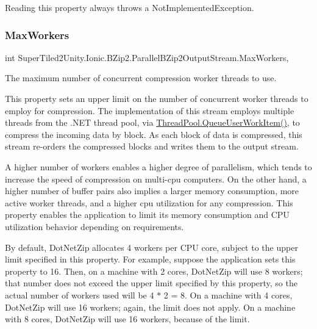 Reading this property always throws a Not\+Implemented\+Exception. 

\mbox{\label{class_super_tiled2_unity_1_1_ionic_1_1_b_zip2_1_1_parallel_b_zip2_output_stream_a489040cd5f0d61998d1d64ed539cdfd2}} 
\subsubsection{\texorpdfstring{Max\+Workers}{MaxWorkers}}
{\footnotesize\ttfamily int Super\+Tiled2\+Unity.\+Ionic.\+B\+Zip2.\+Parallel\+B\+Zip2\+Output\+Stream.\+Max\+Workers\hspace{0.3cm}{\ttfamily [get]}, {\ttfamily [set]}}



The maximum number of concurrent compression worker threads to use. 

This property sets an upper limit on the number of concurrent worker threads to employ for compression. The implementation of this stream employs multiple threads from the .N\+ET thread pool, via \mbox{\hyperlink{}{Thread\+Pool.\+Queue\+User\+Work\+Item()}}, to compress the incoming data by block. As each block of data is compressed, this stream re-\/orders the compressed blocks and writes them to the output stream. 

A higher number of workers enables a higher degree of parallelism, which tends to increase the speed of compression on multi-\/cpu computers. On the other hand, a higher number of buffer pairs also implies a larger memory consumption, more active worker threads, and a higher cpu utilization for any compression. This property enables the application to limit its memory consumption and C\+PU utilization behavior depending on requirements. 

By default, Dot\+Net\+Zip allocates 4 workers per C\+PU core, subject to the upper limit specified in this property. For example, suppose the application sets this property to 16. Then, on a machine with 2 cores, Dot\+Net\+Zip will use 8 workers; that number does not exceed the upper limit specified by this property, so the actual number of workers used will be 4 $\ast$ 2 = 8. On a machine with 4 cores, Dot\+Net\+Zip will use 16 workers; again, the limit does not apply. On a machine with 8 cores, Dot\+Net\+Zip will use 16 workers, because of the limit. 

